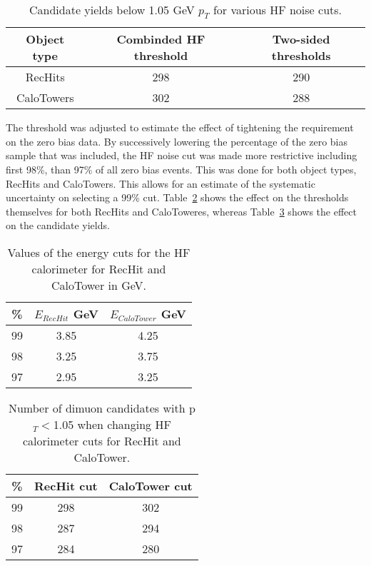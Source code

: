       \begin{table}[!Hhbt]
        \centering
        \begin{tabular}{|c|c|c|}
          \hline
          Object type & Combinded HF threshold & Two-sided thresholds \\ \hline
          RecHits & 298 & 290 \\ \hline
          CaloTowers & 302 & 288 \\ \hline
        \end{tabular}
        \caption{Candidate yields below 1.05 GeV $p_{T}$ for various HF noise
          cuts.}
        \label{tab:hfCutYieldEffects}
      \end{table}

      The threshold was adjusted to estimate the effect of tightening the
        requirement on the zero bias data.
      By successively lowering the percentage of the zero bias sample
        that was included, the HF noise cut was made more restrictive including
        first 98\%, than 97\% of all zero bias events. 
      This was done for both object types, RecHits and CaloTowers.
      This allows for an estimate of the systematic uncertainty on selecting 
        a 99\% cut.
      Table~\ref{tab:hfAdjustedThresholds} shows the effect on the thresholds
        themselves for both RecHits and CaloToweres, whereas 
        Table~\ref{tab:hfAdjThreshYields} shows the effect on the candidate 
        yields.

      \begin{table}[!Hhbt]
        \begin{center}
          \caption{Values of the energy cuts for the HF calorimeter for RecHit and CaloTower in GeV.}
          \label{tab:hfAdjustedThresholds}
          \begin{tabular}{|c|c|c|} \hline
            \% &  $E_{RecHit}$ GeV & $E_{CaloTower}$ GeV\\ 
            \hline
            99 & 3.85& 4.25 \\ \hline
            98 & 3.25& 3.75 \\ \hline
            97 & 2.95& 3.25 \\  \hline
           \end{tabular}
         \end{center}
      \end{table}

      \begin{table}[!Hhbt]
        \begin{center}
          \caption{Number of dimuon candidates with  p$_{T} <$1.05 when changing HF calorimeter cuts for RecHit and CaloTower.}
          \label{tab:hfAdjThreshYields}
          \begin{tabular}{|c|c|c|} \hline
            \% &  RecHit cut & CaloTower cut\\ \hline
            99 &   298 & 302 \\ \hline
            98 &  287  & 294 \\ \hline
            97 & 284 & 280 \\ \hline
          \end{tabular}
        \end{center}
      \end{table}

